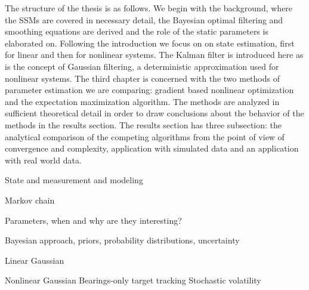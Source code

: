 The structure of the thesis is as follows. We begin with the background, where
the SSMs are covered in necessary detail, the Bayesian optimal filtering
and smoothing equations are derived and the role of the static parameters is elaborated
on. Following the introduction we focus on on state estimation, first for linear
and then for nonlinear systems. The Kalman filter is introduced here as is the
concept of Gaussian filtering, a deterministic approximation used for nonlinear systems. 
The third chapter is concerned with the two methods
of parameter estimation we are comparing: gradient based nonlinear optimization
and the expectation maximization algorithm. The methods are analyzed in sufficient
theoretical detail in order to draw conclusions about the behavior of the methods
in the results section. The results section has three subsection: the analytical 
comparison of the competing algorithms from the point of view of convergence
and complexity, application with simulated data and an application with real world data.

State and measurement and modeling

Markov chain

Parameters, when and why are they interesting?

Bayesian approach, priors, probability distributions, uncertainty

Linear Gaussian 
  


Nonlinear Gaussian
  Bearings-only target tracking
  Stochastic volatility



